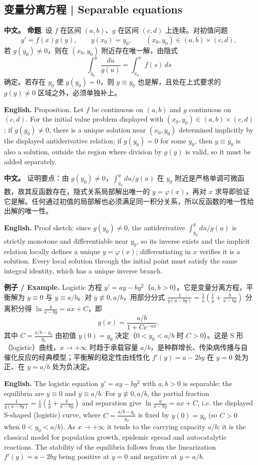 \documentclass[UTF8,11pt,a4paper]{ctexart}
\newcommand{\APS}[2]{\par\noindent\textbf{中文。} #1\par\noindent\textbf{English.} #2\par}
\newcommand{\EN}[1]{\par\noindent \textbf{English.} #1\par}
\newcommand{\EX}[2]{\par\noindent \textbf{例子 / Example.} #1\par\EN{#2}}
\begin{document}
\subsection{变量分离方程 | Separable equations}
\APS{\textbf{命题}. 设 $f$ 在区间 $(a,b)$、$g$ 在区间 $(c,d)$ 上连续。对初值问题
\[
y'=f(x)g(y),\qquad y(x_0)=y_0,\qquad (x_0,y_0)\in(a,b)\times(c,d),
\]
若 $g(y_0)\ne0$，则在 $(x_0,y_0)$ 附近存在唯一解，由隐式
\[
\int_{y_0}^{y}\frac{du}{g(u)}=\int_{x_0}^{x}f(s)\,ds
\]
确定。若存在 $y_0$ 使 $g(y_0)=0$，则 $y\equiv y_0$ 也是解，且处在上式要求的 $g(y)\ne0$ 区域之外，必须单独补上。}{Proposition. Let $f$ be continuous on $(a,b)$ and $g$ continuous on $(c,d)$. For the initial value problem displayed with $(x_0,y_0)\in(a,b)\times(c,d)$: if $g(y_0)\ne0$, there is a unique solution near $(x_0,y_0)$ determined implicitly by the displayed antiderivative relation; if $g(y_0)=0$ for some $y_0$, then $y\equiv y_0$ is also a solution, outside the region where division by $g(y)$ is valid, so it must be added separately.}
\APS{证明要点：由 $g(y_0)\ne0$，$\int_{y_0}^{y}du/g(u)$ 在 $y_0$ 附近是严格单调可微函数，故其反函数存在，隐式关系局部解出唯一的 $y=\varphi(x)$，再对 $x$ 求导即验证它是解。任何通过初值的局部解也必须满足同一积分关系，所以反函数的唯一性给出解的唯一性。}{Proof sketch: since $g(y_0)\ne0$, the antiderivative $\int_{y_0}^{y}du/g(u)$ is strictly monotone and differentiable near $y_0$, so its inverse exists and the implicit relation locally defines a unique $y=\varphi(x)$; differentiating in $x$ verifies it is a solution. Every local solution through the initial point must satisfy the same integral identity, which has a unique inverse branch.}
\EX{Logistic 方程 $y'=ay-by^2$（$a,b>0$）。它是变量分离方程，平衡解为 $y\equiv0$ 与 $y\equiv a/b$。对 $y\not\equiv0,a/b$，用部分分式 $\frac1{y(a-by)}=\frac1a\left(\frac1y+\frac b{a-by}\right)$ 分离积分得 $\ln\frac{y}{a-by}=ax+C$，即
\[
y(x)=\frac{a/b}{1+Ce^{-ax}},
\]
其中 $C=\frac{a/b-y_0}{y_0}$ 由初值 $y(0)=y_0$ 决定（$0<y_0<a/b$ 时 $C>0$）。这是 S 形（logistic）曲线，$x\to+\infty$ 时趋于承载容量 $a/b$，是种群增长、传染病传播与自催化反应的经典模型；平衡解的稳定性由线性化 $f'(y)=a-2by$ 在 $y=0$ 处为正、在 $y=a/b$ 处为负决定。}{The logistic equation $y'=ay-by^2$ with $a,b>0$ is separable; the equilibria are $y\equiv0$ and $y\equiv a/b$. For $y\not\equiv0,a/b$, the partial fraction $\frac1{y(a-by)}=\frac1a\left(\frac1y+\frac b{a-by}\right)$ and separation give $\ln\frac{y}{a-by}=ax+C$, i.e. the displayed S-shaped (logistic) curve, where $C=\frac{a/b-y_0}{y_0}$ is fixed by $y(0)=y_0$ (so $C>0$ when $0<y_0<a/b$). As $x\to+\infty$ it tends to the carrying capacity $a/b$; it is the classical model for population growth, epidemic spread and autocatalytic reactions. The stability of the equilibria follows from the linearization $f'(y)=a-2by$ being positive at $y=0$ and negative at $y=a/b$.}
\end{document}
